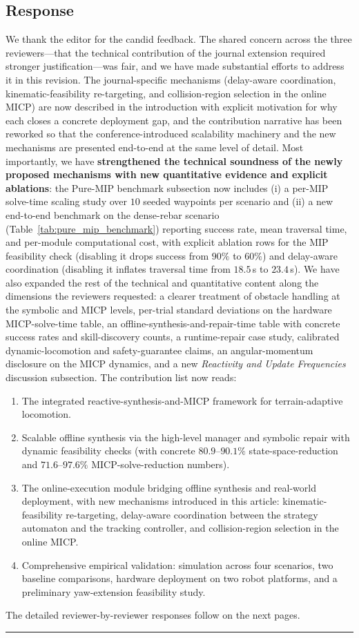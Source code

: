 \subsection{Response}
We thank the editor for the candid feedback. The shared concern across the three reviewers---that the technical contribution of the journal extension required stronger justification---was fair, and we have made substantial efforts to address it in this revision. The journal-specific mechanisms (delay-aware coordination, kinematic-feasibility re-targeting, and collision-region selection in the online MICP) are now described in the introduction with explicit motivation for why each closes a concrete deployment gap, and the contribution narrative has been reworked so that the conference-introduced scalability machinery and the new mechanisms are presented end-to-end at the same level of detail. Most importantly, we have \textbf{strengthened the technical soundness of the newly proposed mechanisms with new quantitative evidence and explicit ablations}: the Pure-MIP benchmark subsection now includes (i) a per-MIP solve-time scaling study over $10$ seeded waypoints per scenario and (ii) a new end-to-end benchmark on the dense-rebar scenario (Table~\ref{tab:pure_mip_benchmark}) reporting success rate, mean traversal time, and per-module computational cost, with explicit ablation rows for the MIP feasibility check (disabling it drops success from $90\%$ to $60\%$) and delay-aware coordination (disabling it inflates traversal time from $18.5$\,s to $23.4$\,s). We have also expanded the rest of the technical and quantitative content along the dimensions the reviewers requested: a clearer treatment of obstacle handling at the symbolic and MICP levels, per-trial standard deviations on the hardware MICP-solve-time table, an offline-synthesis-and-repair-time table with concrete success rates and skill-discovery counts, a runtime-repair case study, calibrated dynamic-locomotion and safety-guarantee claims, an angular-momentum disclosure on the MICP dynamics, and a new \textit{Reactivity and Update Frequencies} discussion subsection. The contribution list now reads:
\begin{enumerate}
    \item The integrated reactive-synthesis-and-MICP framework for terrain-adaptive locomotion.
    \item Scalable offline synthesis via the high-level manager and symbolic repair with dynamic feasibility checks (with concrete $80.9$--$90.1\%$ state-space-reduction and $71.6$--$97.6\%$ MICP-solve-reduction numbers).
    \item The online-execution module bridging offline synthesis and real-world deployment, with new mechanisms introduced in this article: kinematic-feasibility re-targeting, delay-aware coordination between the strategy automaton and the tracking controller, and collision-region selection in the online MICP.
    \item Comprehensive empirical validation: simulation across four scenarios, two baseline comparisons, hardware deployment on two robot platforms, and a preliminary yaw-extension feasibility study.
\end{enumerate}

\noindent The detailed reviewer-by-reviewer responses follow on the next pages.

\noindent\rule{17cm}{6.0pt}
\newpage
